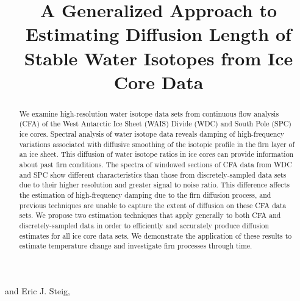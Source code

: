\documentclass[draft, jgrga]{AGUTeX}
\begin{document}

\title{A Generalized Approach to Estimating Diffusion Length of Stable Water Isotopes from Ice Core Data}




 and Eric J. Steig,






\begin{abstract}

We examine high-resolution water isotope data sets from continuous flow analysis (CFA) of the West Antarctic Ice Sheet (WAIS) Divide (WDC) and South Pole (SPC) ice cores. Spectral analysis of water isotope data reveals damping of high-frequency variations associated with diffusive smoothing of the isotopic profile in the firn layer of an ice sheet. This diffusion of water isotope ratios in ice cores can provide information about past firn conditions. The spectra of windowed sections of CFA data from WDC and SPC show different characteristics than those from discretely-sampled data sets due to their higher resolution and greater signal to noise ratio. This difference affects the estimation of high-frequency damping due to the firn diffusion process, and previous techniques are unable to capture the extent of diffusion on these CFA data sets. We propose two estimation techniques that apply generally to both CFA and discretely-sampled data in order to efficiently and accurately produce diffusion estimates for all ice core data sets. We demonstrate the application of these results to estimate temperature change and investigate firn processes through time.

\end{abstract}
\end{document}
